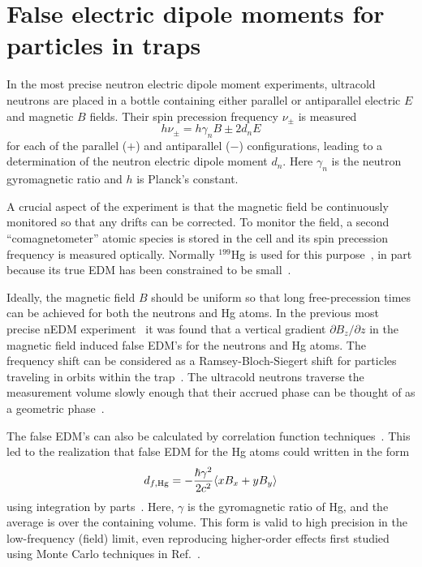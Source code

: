 \documentclass[preprint,12pt]{elsarticle}
\begin{document}

\section{False electric dipole moments for particles in traps}
\label{sec:intro}

In the most precise neutron electric dipole moment experiments,
ultracold neutrons are placed in a bottle containing either parallel
or antiparallel electric $E$ and magnetic $B$ fields.  Their spin
precession frequency $\nu_\pm$ is measured
\begin{equation}
h\nu_\pm=h\gamma_nB\pm 2d_nE
\end{equation}
for each of the parallel ($+$) and antiparallel ($-$) configurations,
leading to a determination of the neutron electric dipole moment
$d_n$.  Here $\gamma_n$ is the neutron gyromagnetic ratio and $h$ is
Planck's constant.

A crucial aspect of the experiment is that the magnetic field be
continuously monitored so that any drifts can be corrected.  To
monitor the field, a second ``comagnetometer'' atomic species is
stored in the cell and its spin precession frequency is measured
optically.  Normally $^{199}$Hg is used for this
purpose~\cite{bib:green,bib:bakernim,bib:hg-better}, in part because
its true EDM has been constrained to be
small~\cite{bib:griffith,bib:hgupdate}.

Ideally, the magnetic field $B$ should be uniform so that long
free-precession times can be achieved for both the neutrons and Hg
atoms.  In the previous most precise nEDM
experiment~\cite{bib:baker,bib:pendlebury} it was found that a
vertical gradient $\partial B_z/\partial z$ in the magnetic field
induced false EDM's for the neutrons and Hg atoms.  The frequency
shift can be considered as a Ramsey-Bloch-Siegert shift for particles
traveling in orbits within the trap~\cite{bib:gpe1,bib:gpe2}.  The
ultracold neutrons traverse the measurement volume slowly enough that
their accrued phase can be thought of as a geometric
phase~\cite{bib:gpe1}.

The false EDM's can also be calculated by correlation function
techniques~\cite{bib:gpe3,bib:gpe4}.  This led to the realization that
false EDM for the Hg atoms could written in the form
\begin{equation}
\label{eq:pignol}
  d_{f,\rm Hg}=-\frac{\hbar\gamma^{2}}{2c^{2}}\langle xB_x+yB_y\rangle
\end{equation}
using integration by parts~\cite{bib:pignol-roccia}.  Here, $\gamma$
is the gyromagnetic ratio of Hg, and the average is over the
containing volume. This form is valid to high precision in the
low-frequency (field) limit, even reproducing higher-order effects
first studied using Monte Carlo techniques in Ref.~\cite{bib:gpe2}.
\end{document}
